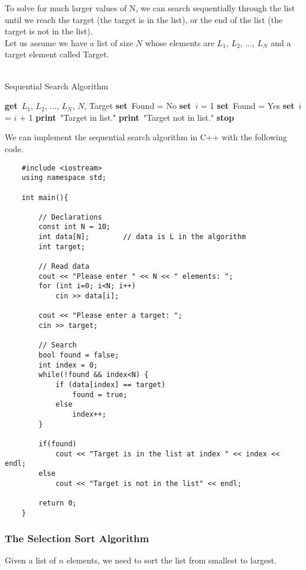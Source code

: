 \documentclass[]{article}
\newcommand{\Get}{\State \textbf{get}~}
\newcommand{\Set}{\State \textbf{set}~}
\newcommand{\Print}{\State \textbf{print}~}
\newcommand{\Stop}{\State \textbf{stop}~}
\begin{document}
To solve for much larger values of N, we can search sequentially through the list until we reach the target (the target is in the list), or the end of the list (the target is not in the list).\\

Let us assume we have a list of size $N$ whose elements are $L_1$, $L_2$, ..., $L_N$ and a target element called Target.

\begin{algorithm}
	\caption{\\Sequential Search Algorithm}
	\begin{algorithmic}[1]
		\Get $L_1$, $L_2$, ..., $L_N$, $N$, Target
		\Set Found = No
		\Set $i$ = 1
		\Set Found = Yes
		\Else
		\Set $i$ = $i$ + 1
		\EndIf
		\EndWhile
		\Print "Target in list."
		\Else
		\Print "Target not in list."
		\EndIf
		\Stop
	\end{algorithmic}
\end{algorithm}\bigbreak

We can implement the sequential search algorithm in C++ with the following code.

\begin{lstlisting}
	#include <iostream>
	using namespace std;
	
	int main(){
		
		// Declarations
		const int N = 10;
		int data[N];		// data is L in the algorithm
		int target;
		
		// Read data
		cout << "Please enter " << N << " elements: ";
		for (int i=0; i<N; i++)
			cin >> data[i];
		
		cout << "Please enter a target: ";
		cin >> target;
		
		// Search
		bool found = false;
		int index = 0;
		while(!found && index<N) {
			if (data[index] == target)
				found = true;
			else
				index++;
		}
		
		if(found)
			cout << "Target is in the list at index " << index << endl;
		else
			cout << "Target is not in the list" << endl;
		
		return 0;
	}
\end{lstlisting}\bigbreak


\subsubsection{The Selection Sort Algorithm} \label{selectionsort}
\bigbreak

Given a list of $n$ elements, we need to sort the list from smallest to largest.\\
\end{document}
